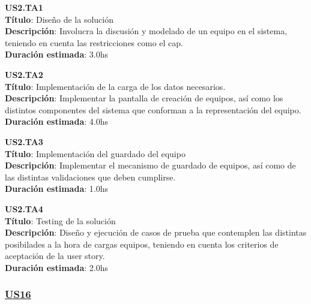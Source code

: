 \begin{tcolorbox}
\textbf{US2.TA1} \\
\textbf{Título}: Diseño de la solución \\
\textbf{Descripción}: Involucra la discusión y modelado de un equipo en el sistema, teniendo en cuenta las restricciones como el cap.\\
\textbf{Duración estimada}: 3.0hs
\end{tcolorbox}
\vspace{10pt}

\begin{tcolorbox}
\textbf{US2.TA2} \\
\textbf{Título}: Implementación de la carga de los datos necesarios.\\
\textbf{Descripción}: Implementar la pantalla de creación de equipos, así como los distintos componentes del sistema que conforman a la representación del equipo.\\
\textbf{Duración estimada}: 4.0hs
\end{tcolorbox}
\vspace{10pt}

\begin{tcolorbox}
\textbf{US2.TA3} \\
\textbf{Título}: Implementación del guardado del equipo \\
\textbf{Descripción}: Implementar el mecanismo de guardado de equipos, así como de las distintas validaciones que deben cumplirse.\\
\textbf{Duración estimada}: 1.0hs
\end{tcolorbox}
\vspace{10pt}


\begin{tcolorbox}
\textbf{US2.TA4} \\
\textbf{Título}: Testing de la solución \\
\textbf{Descripción}: Diseño y ejecución de casos de prueba que contemplen las distintas posibilades a la hora de cargas equipos, teniendo en cuenta los criterios de aceptación de la user story.\\
\textbf{Duración estimada}: 2.0hs
\end{tcolorbox}
\vspace{10pt}

\subsubsection*{\underline{US16}}

